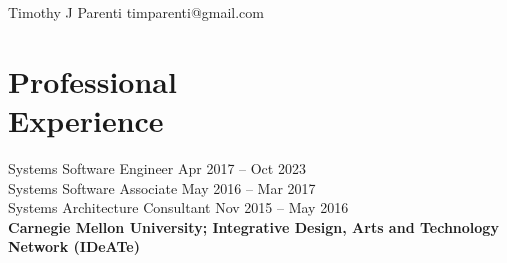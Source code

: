 \documentclass[11pt]{article}
\newcommand{\textdb}[1]{\fontseries{db}\selectfont#1\normalfont}
\begin{document}
\begin{adjustwidth}{-1in}{0pt}
	\textsf{\Huge{Timothy J Parenti}} \hfill timparenti@gmail.com \par
	\hrulefill
\end{adjustwidth}



\section{Professional\\ Experience}

\textdb{
Systems Software Engineer
	\hfill Apr 2017 -- Oct 2023 \\
}
\textdb{
Systems Software Associate
	\hfill May 2016 -- Mar 2017 \\
}
\textdb{
Systems Architecture Consultant
	\hfill Nov 2015 -- May 2016 \\
}
\textbf{Carnegie Mellon University; Integrative Design, Arts and Technology Network (IDeATe)}
\end{document}
